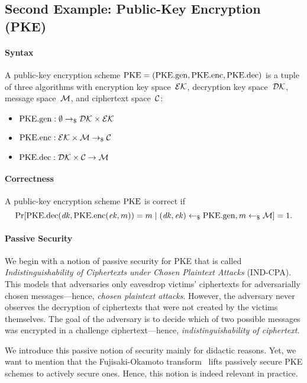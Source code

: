 \subsection{Second Example: Public-Key Encryption (PKE)}
\label{sec:overview:pke}

\paragraph{Syntax}
A public-key encryption scheme $\mathrm{PKE}=(\mathrm{PKE}.\mathrm{gen},\mathrm{PKE}.\mathrm{enc},\mathrm{PKE}.\mathrm{dec})$ is a tuple of three algorithms with encryption key space~$\mathcal{EK}$, decryption key space~$\mathcal{DK}$, message space~$\mathcal{M}$, and ciphertext space~$\mathcal{C}$:

\begin{itemize}
    \item $\mathrm{PKE}.\mathrm{gen}: \emptyset \to_\$ \mathcal{DK}\times\mathcal{EK}$
    \item $\mathrm{PKE}.\mathrm{enc}: \mathcal{EK}\times\mathcal{M} \to_\$ \mathcal{C}$
    \item $\mathrm{PKE}.\mathrm{dec}: \mathcal{DK}\times\mathcal{C} \to \mathcal{M}$
\end{itemize}

\paragraph{Correctness}
A public-key encryption scheme $\mathrm{PKE}$ is correct if
\[
\Pr[\mathrm{PKE}.\mathrm{dec}(\mathit{dk},\mathrm{PKE}.\mathrm{enc}(\mathit{ek},m))=m\mid (\mathit{dk},\mathit{ek})\gets_\$\mathrm{PKE}.\mathrm{gen},m\gets_\$\mathcal{M}]=1\text{.}
\]

\paragraph{Passive Security}
We begin with a notion of passive security for PKE that is called \emph{Indistinguishability of Ciphertexts under Chosen Plaintext Attacks} (IND-CPA).
This models that adversaries only eavesdrop victims' ciphertexts for adversarially chosen messages---hence, \emph{chosen plaintext attacks}.
However, the adversary never observes the decryption of ciphertexts that were not created by the victims themselves.
The goal of the adversary is to decide which of two possible messages was encrypted in a challenge ciphertext---hence, \emph{indistinguishability of ciphertext}.

We introduce this passive notion of security mainly for didactic reasons.
Yet, we want to mention that the Fujisaki-Okamoto transform~\cite{C:FujOka99} lifts passively secure PKE schemes to actively secure ones.
Hence, this notion is indeed relevant in practice.


